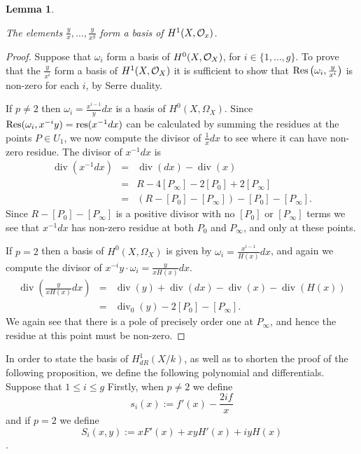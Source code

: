 \documentclass[draft, 11pt]{article} %
\theoremstyle{plain}
\newtheorem{lem}[defn]{Lemma}
\theoremstyle{remark}
\newcommand{\cO}{{\cal O}}
\DeclareMathOperator{\di}{div}
\begin{document}
\begin{lem}\label{basish1}
 
 The elements $\frac{y}{x}, \ldots , \frac{y}{x^g}$ form a basis of $H^1(X,\cO_x)$.
 
\end{lem}
\begin{proof}
 
 Suppose that $\omega_i$ form a basis of $H^0(X,\cO_X)$, for $i \in \{ 1,\ldots , g\}$.
To prove that the $\frac{y}{x^i}$ form a basis of $H^1(X,\cO_X)$ it is sufficient to show that ${\rm Res} \left( \omega_i, \frac{y}{x^i}\right)$ is non-zero for each $i$, by Serre duality. 

 
If $p \neq 2$ then $\omega_i = \frac{x^{i-1}}{y}dx$ is a basis of $H^0(X, \Omega_X)$.
Since ${\rm Res}(\omega_i, x^{-i}y) = {\rm res}(x^{-1}dx)$ can be calculated by summing the residues at the points $P \in U_1$, we now compute the divisor of $\frac{1}{x}dx$ to see where it can have non-zero residue.
The divisor of $x^{-1}dx$ is
\begin{eqnarray*}
\di (x^{-1}dx) & = & \di(dx) - \di (x) \\
& = & R - 4[P_\infty] - 2[P_0] + 2[P_\infty] \\
& = & (R-[P_0]-[P_\infty]) - [P_0] - [P_\infty].
\end{eqnarray*}
Since $R -[P_0]-[P_\infty]$ is a positive divisor with no $[P_0]$ or $[P_\infty]$ terms we see that $x^{-1}dx$ has non-zero residue at both $P_0$ and $P_\infty$, and only at these points.

If $p=2$ then a basis of $H^0(X,\Omega_X)$ is given by $\omega_i = \frac{x^{i-1}}{H(x)}dx$, and again we compute the divisor of $x^{-i}y\cdot \omega_i = \frac{y}{xH(x)}dx$.
\begin{eqnarray*}
\di\left( \frac{y}{xH(x)}dx \right) & = & \di(y) + \di(dx) - \di(x) - \di(H(x)) \\
& = & \di_0(y) -2[P_0] -[P_\infty].
\end{eqnarray*}
We again see that there is a pole of precisely order one at $P_\infty$, and hence the residue at this point must be non-zero.

\end{proof}


In order to state the basis of $H^1_{dR}(X/k)$, as well as to shorten the proof of the following proposition, we define the following polynomial and differentials.
Suppose that $1 \leq i \leq g$
Firstly, when $p\neq 2$ we define
\[
s_i(x) := f'(x) - \frac{2if}{x}
\]
and if $p = 2$ we define
\[
S_i(x,y) := xF'(x) + xyH'(x) + iyH(x)
\].
\end{document}
